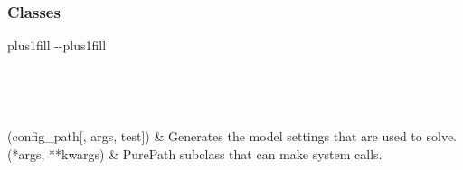 \documentclass[letterpaper,10pt,english]{sphinxmanual}
\begin{document}
\subsubsection*{Classes}


\begin{savenotes}
\sphinxatlongtablestart
\sphinxthistablewithglobalstyle
\sphinxthistablewithnovlinesstyle
\makeatletter
  \LTleft \@totalleftmargin plus1fill
  \LTright\dimexpr\columnwidth-\@totalleftmargin-\linewidth\relax plus1fill
\makeatother
\begin{longtable}{}
\sphinxtoprule
\endfirsthead

\\
\sphinxtoprule
\endhead

\sphinxbottomrule
{}\\
\endfoot

\endlastfoot
\sphinxtableatstartofbodyhook

\sphinxAtStartPar
{}(config\_path{[}, args, test{]})
&
\sphinxAtStartPar
Generates the model settings that are used to solve.
\\
\sphinxhline
\sphinxAtStartPar
{}(*args, **kwargs)
&
\sphinxAtStartPar
PurePath subclass that can make system calls.
\\
\sphinxbottomrule
\end{longtable}
\sphinxtableafterendhook
\sphinxatlongtableend
\end{savenotes}
\end{document}
